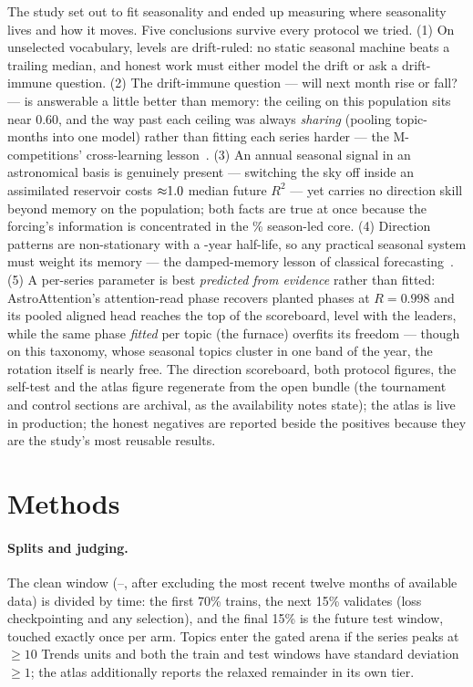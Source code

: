 \documentclass[11pt]{artaquest}
\begin{document}
The study set out to fit seasonality and ended up measuring where seasonality lives and how it
moves. Five conclusions survive every protocol we tried. (1) On unselected vocabulary, levels are
drift-ruled: no static seasonal machine beats a trailing median, and honest work must either
model the drift or ask a drift-immune question. (2) The drift-immune question --- will next month
rise or fall? --- is answerable a little better than memory: the ceiling on this population sits
near $0.60$, and the way past each ceiling was always \emph{sharing} (pooling topic-months into
one model) rather than fitting each series harder --- the M-competitions' cross-learning lesson~\citep{makridakis2020m4,makridakis2022m5}. (3) An annual seasonal signal in an astronomical basis is genuinely present
--- switching the sky off inside an assimilated reservoir costs ${\approx}1.0$ median future
$R^2$ --- yet carries no direction skill beyond memory on the population; both facts are true at
once because the forcing's information is concentrated in the \predictablePct\% season-led core.
(4) Direction patterns are non-stationary with a \gammaHalfLife{}-year half-life, so any
practical seasonal system must weight its memory --- the damped-memory lesson of classical
forecasting~\citep{gardner1985damped,hyndman2018forecasting}. (5) A per-series parameter is best
\emph{predicted from evidence} rather than fitted: AstroAttention's attention-read phase recovers
planted phases at $R = 0.998$ and its pooled aligned head reaches the top of the scoreboard, level with the leaders, while the same
phase \emph{fitted} per topic (the furnace) overfits its freedom --- though on this taxonomy,
whose seasonal topics cluster in one band of the year, the rotation itself is nearly free.
The direction scoreboard, both protocol figures, the self-test and the atlas figure regenerate
from the open bundle (the tournament and control sections are archival, as the availability
notes state); the atlas is live in production; the honest negatives are reported beside the
positives because they are the study's most reusable results.

\section{Methods}

\paragraph{Splits and judging.} The clean window (\winStart{}--\winEnd{}, after excluding the
most recent twelve months of available data) is divided by time: the first 70\% trains, the next
15\% validates (loss checkpointing and any selection), and the final 15\% is the future test
window, touched exactly once per arm. Topics enter the gated arena if the series peaks at
$\geq 10$ Trends units and both the train and test windows have standard deviation $\geq 1$; the
atlas additionally reports the relaxed remainder in its own tier.
\end{document}

